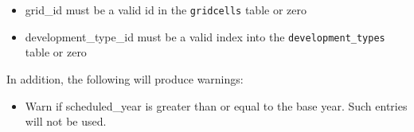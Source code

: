 \begin{itemize} \tight
\item grid_id must be a valid id in the \verb|gridcells| table or zero
\item development_type_id must be a valid index into the \verb|development_types| table or zero
\end{itemize}

In addition, the following will produce warnings:
\begin{itemize} \tight
\item Warn if scheduled_year is greater than or equal to the base year. Such
entries will not be used.
\end{itemize}

